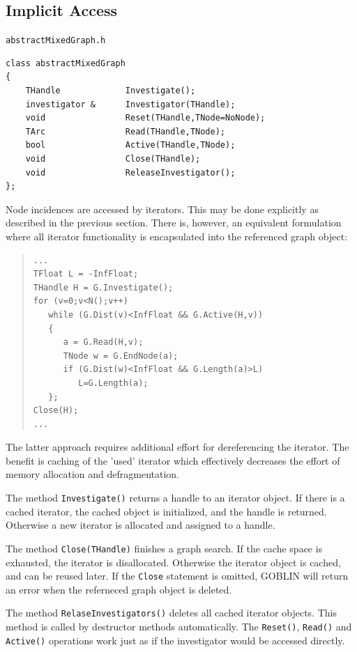 \documentclass[a4paper,11pt,twoside]{book}
\begin{document}
\begin{multicols}{2}
\section{Implicit Access}
\myinclude\verb/abstractMixedGraph.h/
\begin{mymethods}
\begin{verbatim}
class abstractMixedGraph
{
    THandle             Investigate();
    investigator &      Investigator(THandle);
    void                Reset(THandle,TNode=NoNode);
    TArc                Read(THandle,TNode);
    bool                Active(THandle,TNode);
    void                Close(THandle);
    void                ReleaseInvestigator();
};
\end{verbatim}
\end{mymethods}
Node incidences are accessed by iterators. This may be done explicitly as
described in the previous section. There is, however, an equivalent
formulation where all iterator functionality is encapsulated into the
referenced graph object:
\sample
\begin{quote}
\begin{verbatim}
...
TFloat L = -InfFloat;
THandle H = G.Investigate();
for (v=0;v<N();v++)
   while (G.Dist(v)<InfFloat && G.Active(H,v))
   {
      a = G.Read(H,v);
      TNode w = G.EndNode(a);
      if (G.Dist(w)<InfFloat && G.Length(a)>L)
         L=G.Length(a);
   };
Close(H);
...
\end{verbatim}
\end{quote}
The latter approach requires additional effort for dereferencing the
iterator. The benefit is caching of the 'used' iterator which effectively
decreases the effort of memory allocation and defragmentation.

The method \verb/Investigate()/ returns a handle to an iterator object. If
there is a cached iterator, the cached object is initialized, and the handle
is returned. Otherwise a new iterator is allocated and assigned to a handle.

The method \verb/Close(THandle)/ finishes a graph search. If the cache space
is exhausted, the iterator is disallocated. Otherwise the iterator object is
cached, and can be reused later.
If the \verb/Close/ statement is omitted, GOBLIN will return an error when
the referneced graph object is deleted.

The method \verb/RelaseInvestigators()/ deletes all cached iterator objects.
This method is called by destructor methods automatically.
The \verb/Reset()/, \verb/Read()/ and \verb/Active()/ operations work just
as if the investigator would be accessed directly.


\end{multicols}
\end{document}

